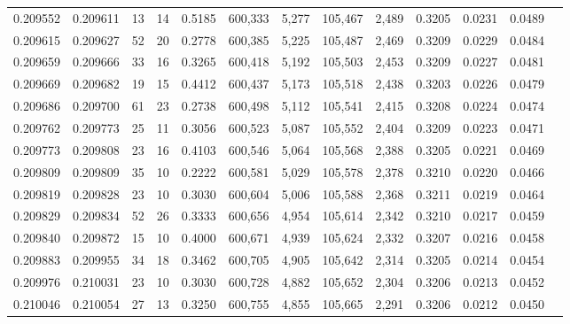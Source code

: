 \begin{tabular}{rrrrrrrrrrrrr}
0.209552 & 0.209611 &    13 &  14 &                                     0.5185 & 600,333 &   5,277 & 105,467 &   2,489 & 0.3205 & 0.0231 & 0.0489 \\
0.209615 & 0.209627 &    52 &  20 &                                     0.2778 & 600,385 &   5,225 & 105,487 &   2,469 & 0.3209 & 0.0229 & 0.0484 \\
0.209659 & 0.209666 &    33 &  16 &                                     0.3265 & 600,418 &   5,192 & 105,503 &   2,453 & 0.3209 & 0.0227 & 0.0481 \\
0.209669 & 0.209682 &    19 &  15 &                                     0.4412 & 600,437 &   5,173 & 105,518 &   2,438 & 0.3203 & 0.0226 & 0.0479 \\
0.209686 & 0.209700 &    61 &  23 &                                     0.2738 & 600,498 &   5,112 & 105,541 &   2,415 & 0.3208 & 0.0224 & 0.0474 \\
0.209762 & 0.209773 &    25 &  11 &                                     0.3056 & 600,523 &   5,087 & 105,552 &   2,404 & 0.3209 & 0.0223 & 0.0471 \\
0.209773 & 0.209808 &    23 &  16 &                                     0.4103 & 600,546 &   5,064 & 105,568 &   2,388 & 0.3205 & 0.0221 & 0.0469 \\
0.209809 & 0.209809 &    35 &  10 &                                     0.2222 & 600,581 &   5,029 & 105,578 &   2,378 & 0.3210 & 0.0220 & 0.0466 \\
0.209819 & 0.209828 &    23 &  10 &                                     0.3030 & 600,604 &   5,006 & 105,588 &   2,368 & 0.3211 & 0.0219 & 0.0464 \\
0.209829 & 0.209834 &    52 &  26 &                                     0.3333 & 600,656 &   4,954 & 105,614 &   2,342 & 0.3210 & 0.0217 & 0.0459 \\
0.209840 & 0.209872 &    15 &  10 &                                     0.4000 & 600,671 &   4,939 & 105,624 &   2,332 & 0.3207 & 0.0216 & 0.0458 \\
0.209883 & 0.209955 &    34 &  18 &                                     0.3462 & 600,705 &   4,905 & 105,642 &   2,314 & 0.3205 & 0.0214 & 0.0454 \\
0.209976 & 0.210031 &    23 &  10 &                                     0.3030 & 600,728 &   4,882 & 105,652 &   2,304 & 0.3206 & 0.0213 & 0.0452 \\
0.210046 & 0.210054 &    27 &  13 &                                     0.3250 & 600,755 &   4,855 & 105,665 &   2,291 & 0.3206 & 0.0212 & 0.0450 \\

\end{tabular}
